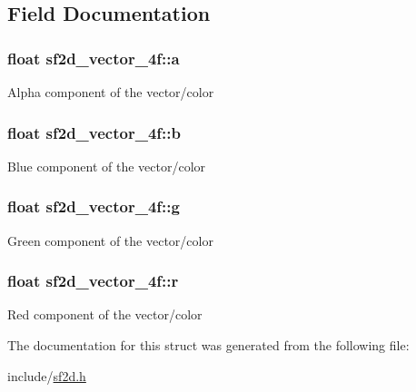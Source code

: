 \subsection{Field Documentation}
\hypertarget{structsf2d__vector__4f_aac68efbadd85967e74d917970f595823}{
\subsubsection[{a}]{\setlength{\rightskip}{0pt plus 5cm}float sf2d\-\_\-vector\-\_\-4f\-::a}}\label{structsf2d__vector__4f_aac68efbadd85967e74d917970f595823}
Alpha component of the vector/color \hypertarget{structsf2d__vector__4f_a086d3a04d19322849a3ffa1e01f18c41}{
\subsubsection[{b}]{\setlength{\rightskip}{0pt plus 5cm}float sf2d\-\_\-vector\-\_\-4f\-::b}}\label{structsf2d__vector__4f_a086d3a04d19322849a3ffa1e01f18c41}
Blue component of the vector/color \hypertarget{structsf2d__vector__4f_a1c6ed8a78238cc48834cfdd3022efa3c}{
\subsubsection[{g}]{\setlength{\rightskip}{0pt plus 5cm}float sf2d\-\_\-vector\-\_\-4f\-::g}}\label{structsf2d__vector__4f_a1c6ed8a78238cc48834cfdd3022efa3c}
Green component of the vector/color \hypertarget{structsf2d__vector__4f_a9b6406bf98af7640a13a9027b64c7b04}{
\subsubsection[{r}]{\setlength{\rightskip}{0pt plus 5cm}float sf2d\-\_\-vector\-\_\-4f\-::r}}\label{structsf2d__vector__4f_a9b6406bf98af7640a13a9027b64c7b04}
Red component of the vector/color 

The documentation for this struct was generated from the following file\-:\begin{DoxyCompactItemize}
\item 
include/\hyperlink{sf2d_8h}{sf2d.\-h}\end{DoxyCompactItemize}
